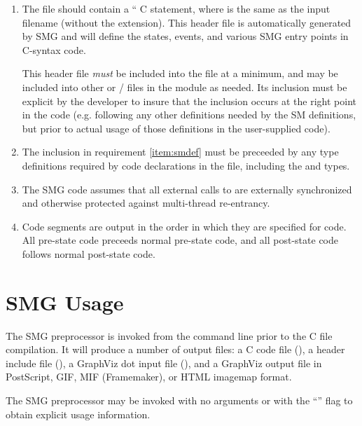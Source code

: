 \begin{enumerate}
\item The  file should contain a `` C statement, where  is the same as
  the  input filename (without the  extension).
  This header file is automatically generated by SMG and will define
  the states, events, and various SMG entry points in C-syntax code.
\label{item:smdef}
  
  This header file {\em must} be included into the  file at
  a minimum, and may be included into other  or
  / files in the module as needed.  Its inclusion
  must be explicit by the developer to insure that the inclusion
  occurs at the right point in the code (e.g. following any other
  definitions needed by the SM definitions, but prior to actual usage
  of those definitions in the user-supplied code).
  
\item The  inclusion in requirement \ref{item:smdef}
  must be preceeded by any type definitions required by code
  declarations in the  file, including the \SMOBJ and
  \SMEVT types.
  
\item The SMG code assumes that all external calls to
   are externally synchronized and
  otherwise protected against multi-thread re-entrancy.
  
\item Code segments are output in the order in which they are
  specified for \TRANSplus code.  All pre-state \TRANSplus code
  preceeds normal pre-state code, and all post-state \TRANSplus code
  follows normal post-state code.

\end{enumerate}


\section{SMG Usage}

The SMG preprocessor is invoked from the command line prior to the C
file compilation.  It will produce a number of output files: a C code
file (), a header include file (), a GraphViz dot
input file (), and a GraphViz output file in PostScript,
GIF, MIF (Framemaker), or HTML imagemap format.

The SMG preprocessor may be invoked with no arguments or with the
``'' flag to obtain explicit usage information.



